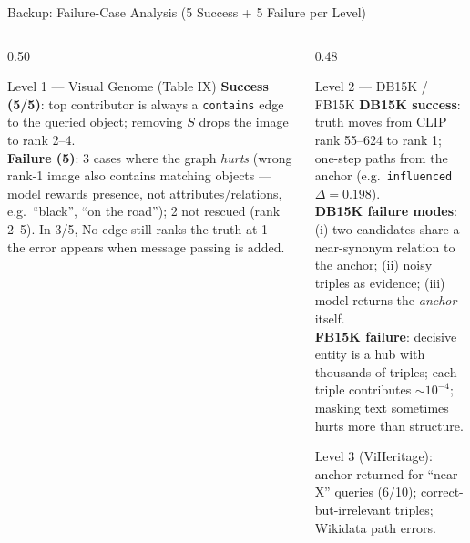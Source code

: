 \documentclass[aspectratio=169,10pt]{beamer}
\begin{document}
\begin{frame}[noframenumbering]{Backup: Failure-Case Analysis (5 Success + 5 Failure per Level)}
  \begin{columns}[t]
    \begin{column}{0.50\textwidth}
      \begin{block}{Level 1 --- Visual Genome (Table IX)}\footnotesize
        \textbf{Success (5/5)}: top contributor is always a \texttt{contains} edge to the queried object; removing $S$ drops the image to rank 2--4.\\[0.15cm]
        \textbf{Failure (5)}: 3 cases where the graph \emph{hurts} (wrong rank-1 image also contains matching objects --- model rewards presence, not attributes/relations, e.g.\ ``black'', ``on the road''); 2 not rescued (rank 2--5). In 3/5, No-edge still ranks the truth at 1 --- the error appears when message passing is added.
      \end{block}
    \end{column}
    \begin{column}{0.48\textwidth}
      \begin{block}{Level 2 --- DB15K / FB15K}\footnotesize
        \textbf{DB15K success}: truth moves from CLIP rank 55--624 to rank 1; one-step paths from the anchor (e.g.\ \texttt{influenced} $\Delta{=}0.198$).\\[0.15cm]
        \textbf{DB15K failure modes}: (i) two candidates share a near-synonym relation to the anchor; (ii) noisy triples as evidence; (iii) model returns the \emph{anchor} itself.\\[0.15cm]
        \textbf{FB15K failure}: decisive entity is a hub with thousands of triples; each triple contributes ${\sim}10^{-4}$; masking text sometimes hurts more than structure.
      \end{block}
      \vspace{0.1cm}
      {\footnotesize\color{Slate} Level 3 (ViHeritage): anchor returned for ``near X'' queries (6/10); correct-but-irrelevant triples; Wikidata path errors.}
    \end{column}
  \end{columns}
\end{frame}
\end{document}
